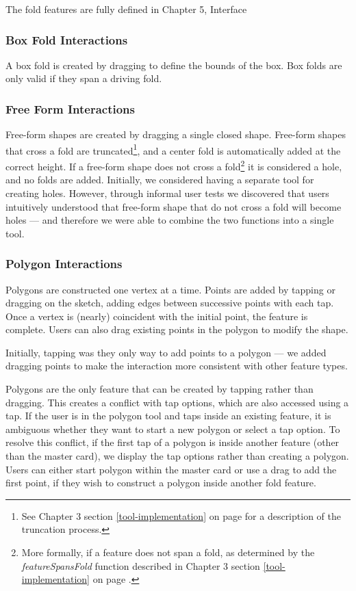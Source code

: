 The fold features are fully defined in Chapter 5, Interface

\subsubsection{Box Fold Interactions}\label{box-fold-interactions}

A box fold is created by dragging to define the bounds of the box. Box
folds are only valid if they span a driving fold.

\subsubsection{Free Form Interactions}\label{free-form-interactions}

Free-form shapes are created by dragging a single closed shape.
Free-form shapes that cross a fold are truncated\footnote{See Chapter 3
  section \ref{tool-implementation} on page \pageref{truncation} for a
  description of the truncation process.}, and a center fold is
automatically added at the correct height. If a free-form shape does not
cross a fold\footnote{More formally, if a feature does not span a fold,
  as determined by the \emph{featureSpansFold} function described in
  Chapter 3 section \ref{tool-implementation} on page
  \pageref{tool-implementation}.} it is considered a hole, and no folds
are added. Initially, we considered having a separate tool for creating
holes. However, through informal user tests we discovered that users
intuitively understood that free-form shape that do not cross a fold
will become holes --- and therefore we were able to combine the two
functions into a single tool.

\subsubsection{Polygon Interactions}\label{polygon-interactions}

Polygons are constructed one vertex at a time. Points are added by
tapping or dragging on the sketch, adding edges between successive
points with each tap. Once a vertex is (nearly) coincident with the
initial point, the feature is complete. Users can also drag existing
points in the polygon to modify the shape.

Initially, tapping was they only way to add points to a polygon --- we
added dragging points to make the interaction more consistent with other
feature types.

Polygons are the only feature that can be created by tapping rather than
dragging. This creates a conflict with tap options, which are also
accessed using a tap. If the user is in the polygon tool and taps inside
an existing feature, it is ambiguous whether they want to start a new
polygon or select a tap option. To resolve this conflict, if the first
tap of a polygon is inside another feature (other than the master card),
we display the tap options rather than creating a polygon. Users can
either start polygon within the master card or use a drag to add the
first point, if they wish to construct a polygon inside another fold
feature.

